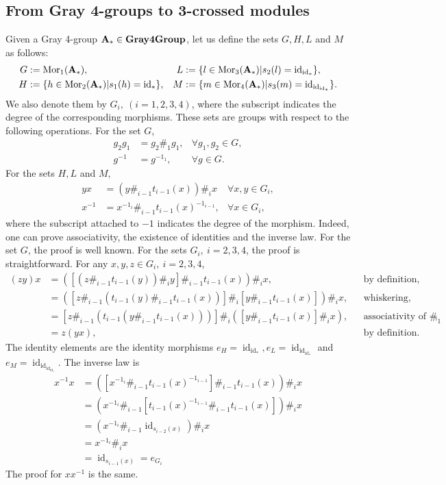 \documentclass[11pt, reqno]{amsart} %
\newcommand{\mor}{{\mathop{\mathrm{Mor}}}}
\newcommand{\id}{{\mathop{\mathrm{id}}}}
\newcommand{\Gray}{{\bf Gray4Group}}
\theoremstyle{definition}
\theoremstyle{remark}
\numberwithin{equation}{section}
\begin{document}
\subsection{From Gray 4-groups to 3-crossed modules}\label{sec:Gray323CM}
Given a Gray 4-group ${\bf A_*}\in \Gray$, let us define the sets $G,H,L$ and $M$ as follows:
\begin{align*}
  G &:= \mor_1({\bf A_*}), &
  L &:= \{l\in\mor_3({\bf A_*})|s_2(l) = \id_{\id_*}\}, \\
  H &:= \{h\in\mor_2({\bf A_*})|s_1(h) = \id_*\}, &
  M &:= \{m\in\mor_4({\bf A_*})|s_3(m) = \id_{\id_{\id_*}}\}.
\end{align*}
We also denote them by $G_i,\ (i=1,2,3,4)$, where the subscript indicates the degree of the corresponding morphisms. These sets are groups with respect to the following operations. For the set $G$, 
\begin{align*}
  g_2g_1 &= g_2\#_1g_1,  & \forall g_1,g_2\in G, \\
  g^{-1} &= g^{-1_1}, & \forall g\in G.
\end{align*}
For the sets $H,L$ and $M$, 
\begin{align*}
  yx &= (y\#_{i-1}t_{i-1}(x))\#_ix & \forall x,y\in G_i, \\
  x^{-1} &= x^{-1_i}\#_{i-1}t_{i-1}(x)^{-1_{i-1}}, & \forall x\in G_i,
\end{align*}
where the subscript attached to $-1$ indicates the degree of the morphism. Indeed, one can prove associativity, the existence of identities and the inverse law. For the set $G$, the proof is well known. For the sets $G_i,\ i=2,3,4$, the proof is straightforward. For any $x,y,z\in G_i,\ i=2,3,4$, 
\begin{align*}
  (zy)x
  &= ([(z\#_{i-1}t_{i-1}(y))\#_iy]\#_{i-1}t_{i-1}(x))\#_ix, & 
  &\text{by definition}, \\
  &= ([z\#_{i-1}(t_{i-1}(y)\#_{i-1}t_{i-1}(x))]\#_i[y\#_{i-1}t_{i-1}(x)])\#_ix, &
  &\text{whiskering}, \\
  &= [z\#_{i-1}(t_{i-1}(y\#_{i-1}t_{i-1}(x)))]\#_i([y\#_{i-1}t_{i-1}(x)]\#_ix), &
  &\text{associativity of $\#_1$}, \\
  &= z(yx), &
  &\text{by definition}.
\end{align*}
The identity elements are the identity morphisms $e_H = \id_{\id_*}, e_L = \id_{\id_{\id_*}}$ and $e_M = \id_{\id_{\id_{\id_*}}}$. The inverse law is
\begin{align*}
  x^{-1}x 
  &= ([x^{-1_i}\#_{i-1}t_{i-1}(x)^{-1_{i-1}}]\#_{i-1}t_{i-1}(x))\#_ix \\
  &= (x^{-1_i}\#_{i-1}[t_{i-1}(x)^{-1_{i-1}}\#_{i-1}t_{i-1}(x)])\#_ix \\
  &= (x^{-1_i}\#_{i-1}\id_{s_{i-2}(x)})\#_ix \\
  &= x^{-1_i}\#_ix \\
  &= \id_{s_{i-1}(x)} = e_{G_i}
\end{align*}
The proof for $xx^{-1}$ is the same.
\end{document}
